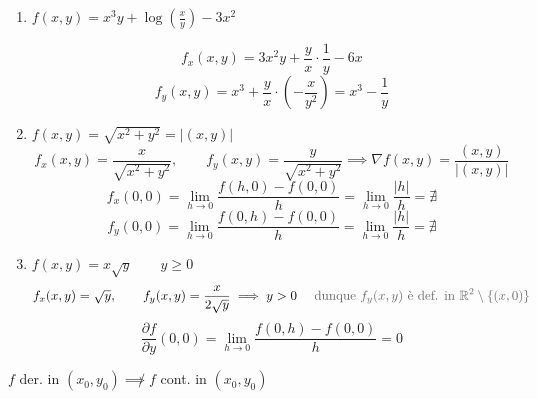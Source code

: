\begin{example}
\begin{enumerate}
    \item $f(x, y) = x^3 y + \log\left(\frac{x}{y}\right) - 3x^2$

    \begin{center}
    \end{center}
    \[
    f_x(x, y) = 3x^2 y + \frac{y}{x} \cdot \frac{1}{y} - 6x
    \]
    \[
    f_y(x, y) = x^3 + \frac{y}{x} \cdot \left(-\frac{x}{y^2}\right) = x^3 - \frac{1}{y}
    \]

    \item $f(x, y) = \sqrt{x^2 + y^2} = \vert (x, y) \vert$
    \[
    f_x(x, y) = \frac{x}{\sqrt{x^2 + y^2}}, \qquad f_y(x, y) = \frac{y}{\sqrt{x^2 + y^2}} \implies \nabla f(x, y) = \frac{(x, y)}{\vert (x, y) \vert}
    \]
    \[
    f_x(0, 0) = \lim_{h \to 0} \frac{f(h, 0) - f(0, 0)}{h} = \lim_{h \to 0} \frac{\vert h \vert}{h} = \nexists
    \]
    \[
    f_y(0, 0) = \lim_{h \to 0} \frac{f(0, h) - f(0, 0)}{h} = \lim_{h \to 0} \frac{\vert h \vert}{h} = \nexists
    \]

    \item $f(x, y) = x\sqrt{y} \qquad y \ge 0$
    \[
    f_x(x, y) = \sqrt{y}, \qquad f_y(x, y) = \frac{x}{2\sqrt{y}} \implies y > 0 \quad \text{\pencilnote{dunque $f_y(x, y)$ è def. in $\mathbb{R}^2 \setminus \{ (x, 0) \}$}}
    \]
    \[
    \frac{\partial f}{\partial y}(0, 0) = \lim_{h \to 0} \frac{f(0, h) - f(0, 0)}{h} = 0
    \]
\end{enumerate}
\end{example}

\begin{oss}
$f$ der. in $(x_0, y_0) \not\implies f$ cont. in $(x_0, y_0)$

\end{oss}

